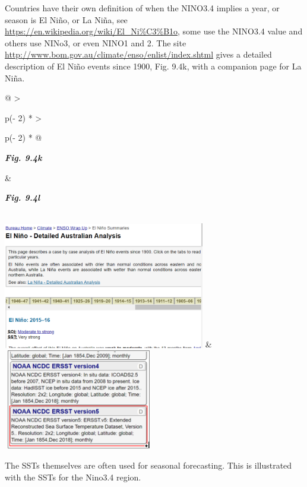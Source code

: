 \documentclass[
  letterpaper,
  DIV=11,
  numbers=noendperiod]{scrreprt}
\begin{document}
Countries have their own definition of when the NINO3.4 implies a year,
or season is El Niño, or La Niña, see
\href{https://en.wikipedia.org/wiki/El_Ni\%C3\%B1o}{\ul{https://en.wikipedia.org/wiki/El\_Ni\%C3\%B1o}},
some use the NINO3.4 value and others use NINo3, or even NINO1 and 2.
The site
\href{http://www.bom.gov.au/climate/enso/enlist/index.shtml}{\ul{http://www.bom.gov.au/climate/enso/enlist/index.shtml}}
gives a detailed description of El Niño events since 1900, Fig. 9.4k,
with a companion page for La Niña.

\begin{longtable}[]{@{}
  >{\raggedright\arraybackslash}p{(\columnwidth - 2\tabcolsep) * }
  >{\raggedright\arraybackslash}p{(\columnwidth - 2\tabcolsep) * }@{}}
\toprule\noalign{}
\begin{minipage}[b]{\linewidth}\raggedright
\textbf{\emph{Fig. 9.4k}}
\end{minipage} & \begin{minipage}[b]{\linewidth}\raggedright
\textbf{\emph{Fig. 9.4l}}
\end{minipage} \\
\midrule\noalign{}
\endhead
\bottomrule\noalign{}
\endlastfoot
\includegraphics[width=3.47098in,height=2.18081in]{figures/Fig9.4k.png}
&
\includegraphics[width=2.5918in,height=1.72133in]{figures/Fig9.4l.png} \\
\end{longtable}

The SSTs themselves are often used for seasonal forecasting. This is
illustrated with the SSTs for the Nino3.4 region.
\end{document}
